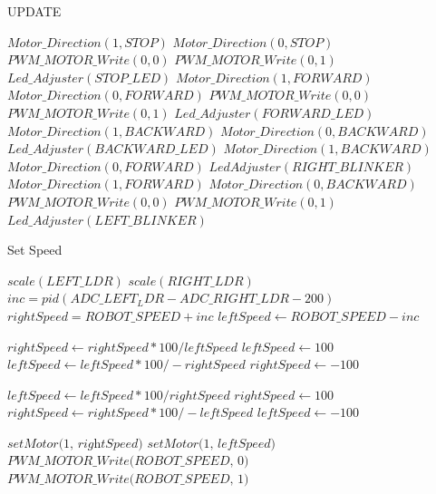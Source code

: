 \documentclass[12pt]{article}
\begin{document}
\begin{algorithm}
\caption{UPDATE}\label{euclid}
\begin{algorithmic}[1]
\Comment{}
        \State $Motor\_Direction(1,STOP)$
        \State $Motor\_Direction(0,STOP)$
        \State $PWM\_MOTOR\_Write(0,0)$
        \State $PWM\_MOTOR\_Write(0,1)$
        \State $Led\_Adjuster(STOP\_LED)$ 
    \EndIf
        \State $Motor\_Direction(1,FORWARD)$
        \State $Motor\_Direction(0,FORWARD)$
        \State $PWM\_MOTOR\_Write(0,0)$
        \State $PWM\_MOTOR\_Write(0,1)$
        \State $Led\_Adjuster(FORWARD\_LED)$ 
    \EndIf
        \State $Motor\_Direction(1,BACKWARD)$
        \State $Motor\_Direction(0,BACKWARD)$
        \State $Led\_Adjuster(BACKWARD\_LED)$ 
    \EndIf
        \State $Motor\_Direction(1,BACKWARD)$
        \State $Motor\_Direction(0,FORWARD)$
        \State $LedAdjuster(RIGHT\_BLINKER)$ 
    \EndIf
        \State $Motor\_Direction(1,FORWARD)$
        \State $Motor\_Direction(0,BACKWARD)$
        \State $PWM\_MOTOR\_Write(0,0)$
        \State $PWM\_MOTOR\_Write(0,1)$
        \State $Led\_Adjuster(LEFT\_BLINKER)$ 
    \EndIf
\EndProcedure
\end{algorithmic}
\end{algorithm}

\begin{algorithm}
\caption{Set Speed}\label{euclid}
\begin{algorithmic}[1]
\Comment{}
    \State $scale(LEFT\_LDR)$
    \State $scale(RIGHT\_LDR)$
    \State $inc = pid(ADC\_LEFT_LDR - ADC\_RIGHT\_LDR - 200)$
    \State $rightSpeed = ROBOT\_SPEED + inc$
    \State $leftSpeed  \gets ROBOT\_SPEED - inc$
    
        \State $rightSpeed \gets rightSpeed * 100 / leftSpeed$
        \State $leftSpeed \gets 100$
            \State $leftSpeed \gets leftSpeed * 100 / -rightSpeed$
            \State $rightSpeed \gets -100$
        \EndIf
    \EndIf
    
        \State $leftSpeed \gets leftSpeed * 100 / rightSpeed$
        \State $rightSpeed \gets 100$
            \State $rightSpeed \gets rightSpeed * 100 / -leftSpeed$
            \State $leftSpeed \gets -100$
        \EndIf
    \EndIf
    
    \State $\textit{setMotor(1, rightSpeed)}$
    \State $\textit{setMotor(1, leftSpeed)}$
\Else
    \State $\textit{PWM\_MOTOR\_Write(ROBOT\_SPEED, 0)}$
    \State $\textit{PWM\_MOTOR\_Write(ROBOT\_SPEED, 1)}$
\EndIf

\EndProcedure
\end{algorithmic}
\end{algorithm}
\end{document}
